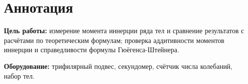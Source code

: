 \section{Аннотация}
\textbf{Цель работы:} измерение момента иннерции ряда тел и сравнение результатов
с расчётами по теоретическим формулам; проверка аддитивности моментов иннерции и
справедливости формулы Гюёгенса-Штейнера.

\textbf{Оборудование:} трифилярный подвес, секундомер, счётчик числа колебаний,
набор тел.
